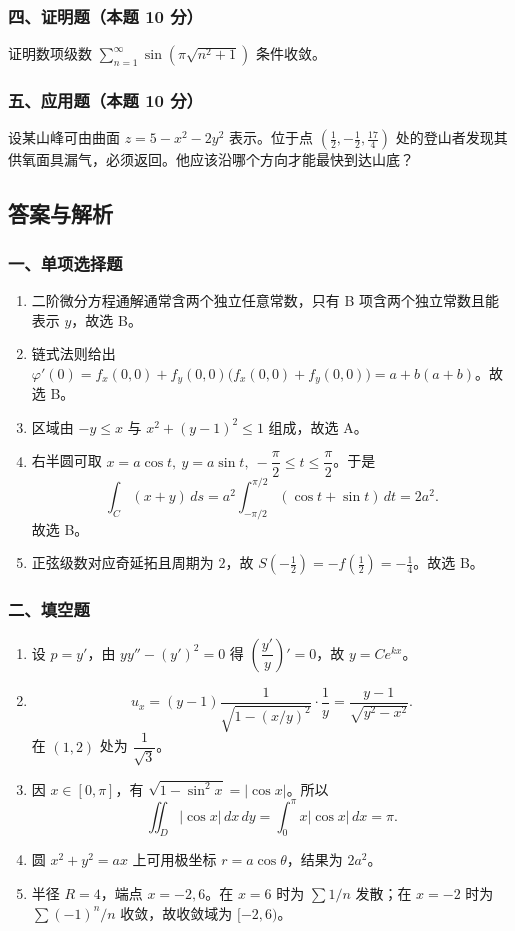 \subsubsection*{四、证明题（本题 10 分）}
证明数项级数 \(\displaystyle \sum_{n=1}^{\infty}\sin(\pi\sqrt{n^2+1})\) 条件收敛。

\subsubsection*{五、应用题（本题 10 分）}
设某山峰可由曲面 \(\displaystyle z=5-x^2-2y^2\) 表示。位于点
\(\displaystyle \left(\frac12,-\frac12,\frac{17}{4}\right)\) 处的登山者发现其供氧面具漏气，必须返回。他应该沿哪个方向才能最快到达山底？

\subsection{答案与解析}

\subsubsection*{一、单项选择题}
\begin{enumerate}
  \item 二阶微分方程通解通常含两个独立任意常数，只有 B 项含两个独立常数且能表示 $y$，故选 B。
  \item 链式法则给出 \(\displaystyle \varphi'(0)=f_x(0,0)+f_y(0,0)\bigl(f_x(0,0)+f_y(0,0)\bigr)=a+b(a+b)\)。故选 B。
  \item 区域由 $-y\le x$ 与 $x^2+(y-1)^2\le1$ 组成，故选 A。
  \item 右半圆可取 $x=a\cos t,\ y=a\sin t,\ -\dfrac\pi2\le t\le\dfrac\pi2$。于是
  \[
  \int_C(x+y)\,ds=a^2\int_{-\pi/2}^{\pi/2}(\cos t+\sin t)\,dt=2a^2.
  \]
  故选 B。
  \item 正弦级数对应奇延拓且周期为 $2$，故 \(\displaystyle S\!\left(-\frac12\right)=-f\!\left(\frac12\right)=-\frac14\)。故选 B。
\end{enumerate}

\subsubsection*{二、填空题}
\begin{enumerate}
  \item 设 $p=y'$，由 \(\displaystyle yy''-(y')^2=0\) 得 $\left(\dfrac{y'}{y}\right)'=0$，故 \(\displaystyle y=Ce^{kx}\)。
  \item
  \[
  u_x=(y-1)\frac1{\sqrt{1-(x/y)^2}}\cdot\frac1y
  =\frac{y-1}{\sqrt{y^2-x^2}}.
  \]
  在 $(1,2)$ 处为 $\dfrac1{\sqrt3}$。
  \item 因 $x\in[0,\pi]$，有 $\sqrt{1-\sin^2x}=|\cos x|$。所以
  \[
  \iint_D|\cos x|\,dx\,dy=\int_0^\pi x|\cos x|\,dx=\pi.
  \]
  \item 圆 $x^2+y^2=ax$ 上可用极坐标 $r=a\cos\theta$，结果为 \(\displaystyle 2a^2\)。
  \item 半径 $R=4$，端点 $x=-2,6$。在 $x=6$ 时为 $\sum 1/n$ 发散；在 $x=-2$ 时为 $\sum(-1)^n/n$ 收敛，故收敛域为
  \(\displaystyle [-2,6)\)。
\end{enumerate}

